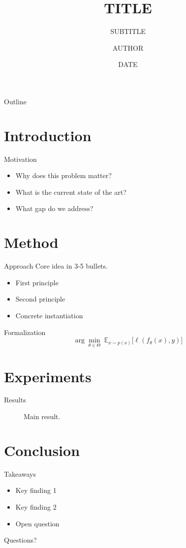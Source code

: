 \documentclass[aspectratio=169,11pt]{beamer}
\title{{{TITLE}}}
\subtitle{{{SUBTITLE}}}
\author{{{AUTHOR}}}
\institute{{{INSTITUTE}}}
\date{{{DATE}}}
\newcommand{\E}{\mathbb{E}}
\begin{document}
\maketitle

\begin{frame}{Outline}
  \tableofcontents
\end{frame}

\section{Introduction}

\begin{frame}{Motivation}
  \begin{itemize}
    \item Why does this problem matter?
    \item What is the current state of the art?
    \item What gap do we address?
  \end{itemize}
\end{frame}

\section{Method}

\begin{frame}{Approach}
  Core idea in 3-5 bullets.
  \begin{itemize}
    \item First principle
    \item Second principle
    \item Concrete instantiation
  \end{itemize}
\end{frame}

\begin{frame}{Formalization}
  \[
    \arg\min_{\theta \in \Theta}\; \E_{x \sim p(x)} \bigl[ \ell(f_\theta(x), y) \bigr]
  \]
\end{frame}

\section{Experiments}

\begin{frame}{Results}
  \begin{figure}[ht]
    \centering
    \caption{Main result.}
    \label{fig:main-result}
  \end{figure}
\end{frame}

\section{Conclusion}

\begin{frame}{Takeaways}
  \begin{itemize}
    \item Key finding 1
    \item Key finding 2
    \item Open question
  \end{itemize}
\end{frame}

\begin{frame}[standout]
  Questions?
\end{frame}
\end{document}
